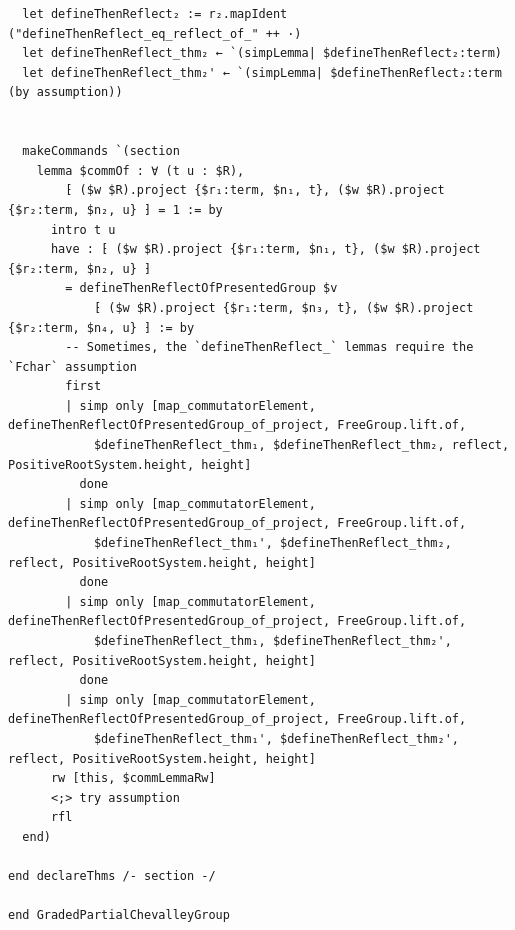 \documentclass[10pt,a4paper]{article}
\begin{document}
\begin{Verbatim}
  let defineThenReflect₂ := r₂.mapIdent ("defineThenReflect_eq_reflect_of_" ++ ·)
  let defineThenReflect_thm₂ ← `(simpLemma| $defineThenReflect₂:term)
  let defineThenReflect_thm₂' ← `(simpLemma| $defineThenReflect₂:term (by assumption))


  makeCommands `(section
    lemma $commOf : ∀ (t u : $R),
        ⁅ ($w $R).project {$r₁:term, $n₁, t}, ($w $R).project {$r₂:term, $n₂, u} ⁆ = 1 := by
      intro t u
      have : ⁅ ($w $R).project {$r₁:term, $n₁, t}, ($w $R).project {$r₂:term, $n₂, u} ⁆
        = defineThenReflectOfPresentedGroup $v
            ⁅ ($w $R).project {$r₁:term, $n₃, t}, ($w $R).project {$r₂:term, $n₄, u} ⁆ := by
        -- Sometimes, the `defineThenReflect_` lemmas require the `Fchar` assumption
        first
        | simp only [map_commutatorElement, defineThenReflectOfPresentedGroup_of_project, FreeGroup.lift.of,
            $defineThenReflect_thm₁, $defineThenReflect_thm₂, reflect, PositiveRootSystem.height, height]
          done
        | simp only [map_commutatorElement, defineThenReflectOfPresentedGroup_of_project, FreeGroup.lift.of,
            $defineThenReflect_thm₁', $defineThenReflect_thm₂, reflect, PositiveRootSystem.height, height]
          done
        | simp only [map_commutatorElement, defineThenReflectOfPresentedGroup_of_project, FreeGroup.lift.of,
            $defineThenReflect_thm₁, $defineThenReflect_thm₂', reflect, PositiveRootSystem.height, height]
          done
        | simp only [map_commutatorElement, defineThenReflectOfPresentedGroup_of_project, FreeGroup.lift.of,
            $defineThenReflect_thm₁', $defineThenReflect_thm₂', reflect, PositiveRootSystem.height, height]
      rw [this, $commLemmaRw]
      <;> try assumption
      rfl
  end)

end declareThms /- section -/

end GradedPartialChevalleyGroup
\end{Verbatim}
\end{document}
